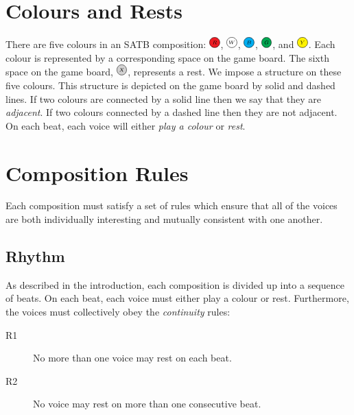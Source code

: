 \documentclass{scrartcl}
\newcommand{\RRR}{
  \begin{tikzpicture}
    \node[circle, draw, fill=Red, inner sep= 0pt, text width=1em, align=center] (n) at (0,0) {$\scriptscriptstyle R$};
  \end{tikzpicture}
}
\newcommand{\WWW}{
  \begin{tikzpicture}
    \node[circle, draw, fill=White,  inner sep= 0pt, text width=1em, align=center] (n) at (0,0) {$\scriptscriptstyle W$};
  \end{tikzpicture}
}
\newcommand{\BBB}{
  \begin{tikzpicture}
    \node[circle, draw, fill=Cyan,  inner sep= 0pt, text width=1em, align=center] (n) at (0,0) {$\scriptscriptstyle B$};
  \end{tikzpicture}
}
\newcommand{\GGG}{
  \begin{tikzpicture}
    \node[circle, draw, fill=Green,  inner sep= 0pt, text width=1em, align=center] (n) at (0,0) {$\scriptscriptstyle G$};
  \end{tikzpicture}
}
\newcommand{\YYY}{
  \begin{tikzpicture}
    \node[circle, draw, fill=Yellow,  inner sep= 0pt, text width=1em, align=center] (n) at (0,0) {$\scriptscriptstyle Y$};
  \end{tikzpicture}
}
\newcommand{\XXX}{
  \begin{tikzpicture}
    \node[circle, draw, fill=Gray!40,  inner sep= 0pt, text width=1em, align=center] (n) at (0,0) {$\scriptscriptstyle X$};
  \end{tikzpicture}
}
\numberwithin{example}{section}
\begin{document}
\section{Colours and Rests}
There are five colours in an SATB composition:
$\RRR$, $\WWW$, $\BBB$, $\GGG$, and $\YYY$.
Each colour is represented by a corresponding space on the game board.
The sixth space on the game board, $\XXX$, represents a rest.
We impose a structure on these five colours. This structure is depicted on the game
board by solid and dashed lines. 
If two colours are connected by a solid line then we say that they are \emph{adjacent}.
If two colours connected by a dashed line then they are not adjacent.
On each beat, each voice will either \emph{play a colour} or \emph{rest}.

\section{Composition Rules}\label{section:composition_rules}
Each composition must satisfy a set of rules which ensure that all of the voices are
both individually interesting and mutually consistent with one another.
 
\subsection{Rhythm}
As described in the introduction, each composition is divided up into a sequence of beats. On each beat, each voice must either play a colour or rest.
Furthermore, the voices must collectively obey the \emph{continuity} rules:
\begin{description}
	\item[R1] No more than one voice may rest on each beat.
	\item[R2] No voice may rest on more than one consecutive beat.
\end{description}
\end{document}
